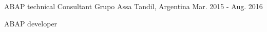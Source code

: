 \begin{cventries}
\cventry
{ABAP technical Consultant} %
{Grupo Assa} %
{Tandil, Argentina} %
{Mar. 2015 - Aug. 2016} %
{ %
\begin{cvitems}
\item {ABAP developer}
\end{cvitems}
}

\end{cventries}
